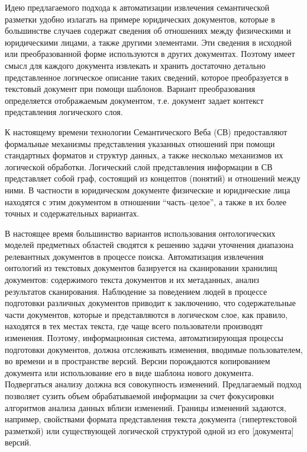 \documentclass[utf8]{../IncArticle}
\newcommand{\e}[2][fcolor]{\textcolor{pcolor}{[}\textcolor{#1}{#2}\textcolor{pcolor}{]}}
\begin{document}
Идею предлагаемого подхода к автоматизации извлечения семантической
разметки удобно излагать на примере юридических документов, которые в
большинстве случаев содержат сведения об отношениях между физическими
и юридическими лицами, а также другими элементами.  Эти сведения в
исходной или преобразованной форме используются в других документах.
Поэтому имеет смысл для каждого документа извлекать и хранить
достаточно детально представленное логическое описание таких сведений,
которое преобразуется в текстовый документ при помощи шаблонов.
Вариант преобразования определяется отображаемым документом,
т.е. документ задает контекст представления логического слоя.

К настоящему времени технологии Семантического Веба (СВ) предоставляют
формальные механизмы представления указанных отношений при помощи
стандартных форматов и структур данных, а также несколько механизмов
их логической обработки.  Логический слой представления информации в СВ
представляет собой граф, состоящий из концептов (понятий) и отношений
между ними.  В частности в юридическом документе физические и
юридические лица находятся с этим документом в отношении
``часть--целое'', а также в их более точных и содержательных вариантах.

В настоящее время большинство вариантов использования онтологических
моделей предметных областей сводятся к решению задачи уточнения
диапазона релевантных документов в процессе поиска.  Автоматизация
извлечения онтологий из текстовых документов базируется на
сканировании хранилищ документов: содержимого текста документов и их
метаданных, анализ результатов сканирования.  Наблюдение за поведением
людей в процессе подготовки различных документов приводит к
заключению, что содержательные части документов, которые и
представляются в логическом слое, как правило, находятся в тех местах
текста, где чаще всего пользователи производят изменения.  Поэтому,
информационная система, автоматизирующая процессы подготовки
документов, должна отслеживать изменения, вводимые пользователем, во
времени и в пространстве версий.  Версии порождаются копированием
документа или использование его в виде шаблона нового
документа.  Подвергаться анализу должна вся совокупность
изменений.  Предлагаемый подход позволяет сузить объем обрабатываемой
информации за счет фокусировки алгоритмов анализа данных вблизи
изменений.  Границы изменений задаются, например, свойствами формата
представления текста документа (гипертекстовой разметкой) или
существующей логической структурой одной из его \e{документа} версий.
\end{document}
